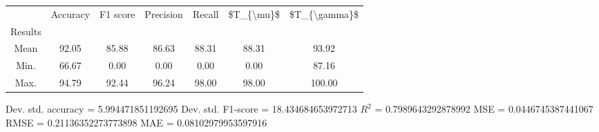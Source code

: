 \begin{tabular}{|c|c|c|c|c|c|c|}
\toprule
{} &  Accuracy &  F1 score &  Precision &  Recall &  \$T\_\{\textbackslash mu\}\$ &  \$T\_\{\textbackslash gamma\}\$ \\
Results &           &           &            &         &            &               \\
\hline
Mean    &     92.05 &     85.88 &      86.63 &   88.31 &      88.31 &         93.92 \\
Min.    &     66.67 &      0.00 &       0.00 &    0.00 &       0.00 &         87.16 \\
Max.    &     94.79 &     92.44 &      96.24 &   98.00 &      98.00 &        100.00 \\
\bottomrule
\end{tabular}

 Dev. std. accuracy = 5.994471851192695
 Dev. std. F1-score = 18.434684653972713
 $R^2$ = 0.7989643292878992
 MSE = 0.0446745387441067
 RMSE = 0.21136352273773898
 MAE = 0.08102979953597916